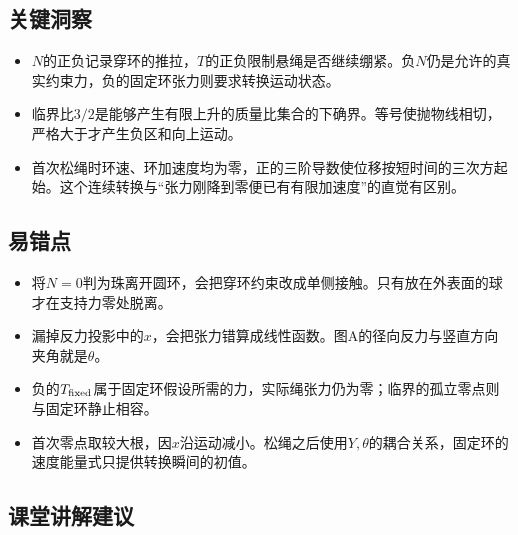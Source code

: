 \documentclass[UTF8,fontset=fandol,a4paper,11pt]{ctexart}
\begin{document}


\subsection*{关键洞察}

\begin{itemize}
\item $N$的正负记录穿环的推拉，$T$的正负限制悬绳是否继续绷紧。负$N$仍是允许的真实约束力，负的固定环张力则要求转换运动状态。
\item 临界比$3/2$是能够产生有限上升的质量比集合的下确界。等号使抛物线相切，严格大于才产生负区和向上运动。
\item 首次松绳时环速、环加速度均为零，正的三阶导数使位移按短时间的三次方起始。这个连续转换与“张力刚降到零便已有有限加速度”的直觉有区别。
\end{itemize}



\subsection*{易错点}

\begin{itemize}
\item 将$N=0$判为珠离开圆环，会把穿环约束改成单侧接触。只有放在外表面的球才在支持力零处脱离。
\item 漏掉反力投影中的$x$，会把张力错算成线性函数。图A的径向反力与竖直方向夹角就是$\theta$。
\item 负的$T_{\rm fixed}$属于固定环假设所需的力，实际绳张力仍为零；临界的孤立零点则与固定环静止相容。
\item 首次零点取较大根，因$x$沿运动减小。松绳之后使用$Y,\theta$的耦合关系，固定环的速度能量式只提供转换瞬间的初值。
\end{itemize}



\subsection*{课堂讲解建议}
\end{document}
